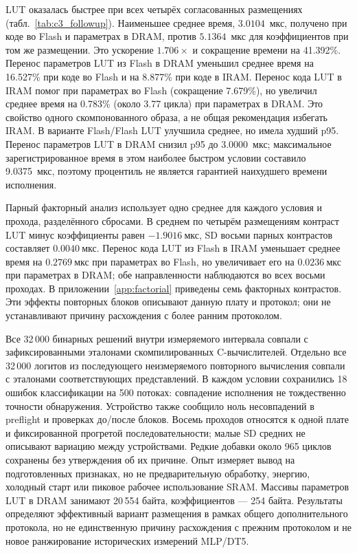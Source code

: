 LUT оказалась быстрее при всех четырёх согласованных размещениях (табл.~\ref{tab:c3_followup}). Наименьшее среднее время, $3.0104$~мкс, получено при коде во Flash и параметрах в DRAM, против $5.1364$~мкс для коэффициентов при том же размещении. Это ускорение $1.706\times$ и сокращение времени на 41.392\%. Перенос параметров LUT из Flash в DRAM уменьшил среднее время на 16.527\% при коде во Flash и на 8.877\% при коде в IRAM. Перенос кода LUT в IRAM помог при параметрах во Flash (сокращение 7.679\%), но увеличил среднее время на 0.783\% (около 3.77 цикла) при параметрах в DRAM. Это свойство одного скомпонованного образа, а не общая рекомендация избегать IRAM. В варианте Flash/Flash LUT улучшила среднее, но имела худший p95. Перенос параметров LUT в DRAM снизил p95 до 3.0000~мкс; максимальное зарегистрированное время в этом наиболее быстром условии составило 9.0375~мкс, поэтому процентиль не является гарантией наихудшего времени исполнения.

Парный факторный анализ использует одно среднее для каждого условия и прохода, разделённого сбросами. В среднем по четырём размещениям контраст LUT минус коэффициенты равен $-1.9016~\text{мкс}$, SD восьми парных контрастов составляет $0.0040~\text{мкс}$. Перенос кода LUT из Flash в IRAM уменьшает среднее время на $0.2769~\text{мкс}$ при параметрах во Flash, но увеличивает его на $0.0236~\text{мкс}$ при параметрах в DRAM; обе направленности наблюдаются во всех восьми проходах. В приложении~\ref{app:factorial} приведены семь факторных контрастов. Эти эффекты повторных блоков описывают данную плату и протокол; они не устанавливают причину расхождения с более ранним протоколом.

Все 32\,000 бинарных решений внутри измеряемого интервала совпали с зафиксированными эталонами скомпилированных C-вычислителей. Отдельно все 32\,000 логитов из последующего неизмеряемого повторного вычисления совпали с эталонами соответствующих представлений. В каждом условии сохранились 18 ошибок классификации на 500 потоках: совпадение исполнения не тождественно точности обнаружения. Устройство также сообщило ноль несовпадений в preflight и проверках до/после блоков. Восемь проходов относятся к одной плате и фиксированной прогретой последовательности; малые SD средних не описывают вариацию между устройствами. Редкие добавки около 965 циклов сохранены без утверждения об их причине. Опыт измеряет вывод на подготовленных признаках, но не предварительную обработку, энергию, холодный старт или пиковое рабочее использование SRAM. Массивы параметров LUT в DRAM занимают 20\,554 байта, коэффициентов --- 254 байта. Результаты определяют эффективный вариант размещения в рамках общего дополнительного протокола, но не единственную причину расхождения с прежним протоколом и не новое ранжирование исторических измерений MLP/DT5.
